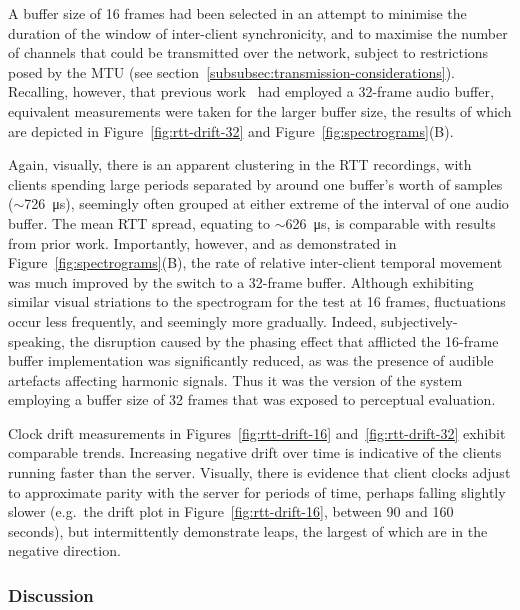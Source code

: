 \documentclass[utf8]{FrontiersinHarvard}
\newcommand{\figref}[1]{Figure~\ref{#1}}
\newcommand{\figsref}[2]{Figures~\ref{#1} and~\ref{#2}}
\newcommand{\secref}[1]{section~\ref{#1}}
\begin{document}
    A buffer size of 16 frames had been selected in an attempt to minimise the
    duration of the window of inter-client synchronicity, and to maximise the
    number of channels that could be transmitted over the network, subject to
    restrictions posed by the MTU (see
    \secref{subsubsec:transmission-considerations}).
    Recalling, however, that previous
    work~\citep{rushton_microcontroller-based_2023}
    had employed a 32-frame audio buffer, equivalent measurements were taken for
    the larger buffer size, the results of which are depicted in
    \figref{fig:rtt-drift-32} and \figref{fig:spectrograms}(B).

    Again, visually, there is an apparent clustering in the RTT recordings, with
    clients spending large periods separated by around one buffer's worth of
    samples ($\sim$\qty{726}{\us}), seemingly often grouped at either
    extreme of the interval of one audio buffer.
    The mean RTT spread, equating to $\sim$\qty{626}{\us}, is comparable with
    results from prior work.
    Importantly, however, and as demonstrated in \figref{fig:spectrograms}(B), the
    rate of relative inter-client temporal movement was much improved by the switch
    to a 32-frame buffer.
    Although exhibiting similar visual striations to the spectrogram for the test
    at 16 frames, fluctuations occur less frequently, and seemingly more
    gradually.
    Indeed, subjectively-speaking, the disruption caused by the phasing effect
    that afflicted the 16-frame buffer implementation was significantly reduced,
    as was the presence of audible artefacts affecting harmonic signals.
    Thus it was the version of the system employing a buffer size of 32 frames
    that was exposed to perceptual evaluation.

    Clock drift measurements in \figsref{fig:rtt-drift-16}{fig:rtt-drift-32} exhibit
    comparable trends.
    Increasing negative drift over time is indicative of the clients running faster
    than the server.
    Visually, there is evidence that client clocks adjust to approximate parity
    with the server for periods of time, perhaps falling slightly slower (e.g.\
    the drift plot in \figref{fig:rtt-drift-16}, between 90 and 160 seconds), but
    intermittently demonstrate leaps, the largest of which are in the negative
    direction.

    \subsubsection{Discussion}\label{subsubsec:discussion-tech}
\end{document}
